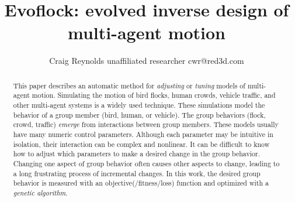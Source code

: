\documentclass[letterpaper]{article}
\begin{document}
\title{Evoflock: evolved inverse design of multi-agent motion}

\author{Craig Reynolds\authorcr
    unaffiliated researcher\authorcr 
    cwr@red3d.com}


\captionsetup{hypcap=false}


\date{}

\maketitle



\begin{abstract}
    This paper describes an automatic method for \textit{adjusting} or \textit{tuning} models of multi-agent motion. Simulating the motion of bird flocks, human crowds, vehicle traffic, and other multi-agent systems is a widely used technique. These simulations model the behavior of a group member (bird, human, or vehicle). The group behaviors (flock, crowd, traffic) \textit{emerge} from interactions between group members. These models usually have many numeric control parameters. Although each parameter may be intuitive in isolation, their interaction can be complex and nonlinear. It can be difficult to know how to adjust which parameters to make a desired change in the group behavior. Changing one aspect of group behavior often causes other aspects to change, leading to a long frustrating process of incremental changes. In this work, the desired group behavior is measured with an objective(/fitness/loss) function and optimized with a \textit{genetic algorithm}.
\end{abstract}
\end{document}

